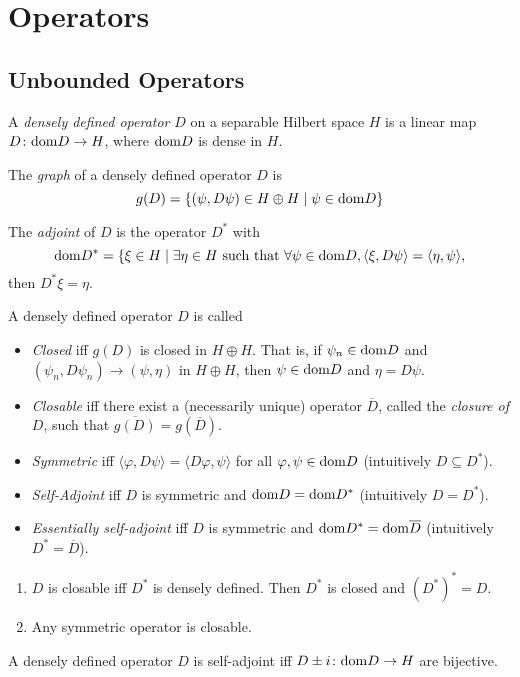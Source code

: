 
\section{Operators}
\subsection{Unbounded Operators}
\begin{definition}
 A \emph{densely defined operator} $D$ on a separable Hilbert space $H$ is a linear map $D\colon\mathrm{dom} D\to H$, where $\mathrm{dom} D$ is dense in $H$.
\end{definition}

\begin{definition}
 The \emph{graph} of a densely defined operator $D$ is $$g(D)=\{(\psi,D\psi)\in H\oplus H\mid\psi\in\mathrm{dom} D\}$$
\end{definition}

\begin{definition}
 The \emph{adjoint} of $D$ is the operator $D^\ast$ with $$\mathrm{dom} D^\ast=\{\xi\in H\mid \exists\eta\in H\text{ such that }\forall\psi\in\mathrm{dom} D, \langle\xi, D\psi\rangle=\langle\eta,\psi\rangle,$$
 then $D^\ast\xi=\eta$.
\end{definition}

\begin{definition}
 A densely defined operator $D$ is called
 \begin{itemize}
  \item \emph{Closed} iff $g(D)$ is closed in $H\oplus H$. That is, if $\psi_n\in\mathrm{dom} D$ and $(\psi_n,D\psi_n)\to(\psi,\eta)$ in $H\oplus H$, then $\psi\in\mathrm{dom} D$ and $\eta=D\psi$.
  \item \emph{Closable} iff there exist a (necessarily unique) operator $\overline{D}$, called the \emph{closure of $D$}, such that $\overline{g(D)}=g(\overline{D})$.
  \item \emph{Symmetric} iff $\langle\varphi, D\psi\rangle=\langle D\varphi,\psi\rangle$ for all $\varphi,\psi\in\mathrm{dom} D$ (intuitively $D\subseteq D^\ast$).
  \item \emph{Self-Adjoint} iff $D$ is symmetric and $\mathrm{dom} D=\mathrm{dom} D^\ast$ (intuitively $D=D^\ast$).
  \item \emph{Essentially self-adjoint} iff $D$ is symmetric and $\mathrm{dom} D^\ast=\mathrm{dom}\overline{D}$ (intuitively $D^\ast=\overline{D}$).
 \end{itemize}
\end{definition}
\begin{fact}\noindent 
 \begin{enumerate}
  \item $D$ is closable iff $D^\ast$ is densely defined. Then $D^\ast$ is closed and $(D^\ast)^\ast=D$.
  \item Any symmetric operator is closable.
 \end{enumerate}
\end{fact}
\begin{theorem}
 A densely defined operator $D$ is self-adjoint iff $D\pm i\colon\mathrm{dom} D\to H$ are bijective.
\end{theorem}

